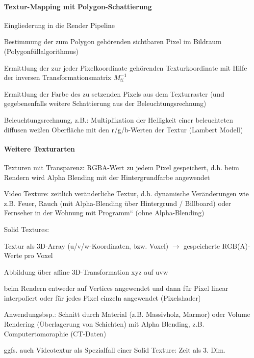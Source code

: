 \documentclass[landscape]{article}
\begin{document}
\begin{multicols}{3}
  \paragraph{Textur-Mapping mit Polygon-Schattierung}
  Eingliederung in die Render Pipeline
  \begin{itemize*}
    \item Bestimmung der zum Polygon gehörenden sichtbaren Pixel im Bildraum (Polygonfüllalgorithmus)
    \item Ermittlung der zur jeder Pixelkoordinate gehörenden Texturkoordinate mit Hilfe der inversen Transformationsmatrix $M_{ti}^{-1}$
    \item Ermittlung der Farbe des zu setzenden Pixels aus dem Texturraster (und gegebenenfalls weitere Schattierung aus der Beleuchtungsrechnung)
    \item Beleuchtungsrechnung, z.B.: Multiplikation der Helligkeit einer beleuchteten diffusen weißen Oberfläche mit den r/g/b-Werten der Textur (Lambert Modell)
  \end{itemize*}
  
  \paragraph{Weitere Texturarten}
  \begin{itemize*}
    \item Texturen mit Transparenz: RGBA-Wert zu jedem Pixel gespeichert, d.h. beim Rendern wird Alpha Blending mit der Hintergrundfarbe angewendet
    \item Video Texture: zeitlich veränderliche Textur, d.h. dynamische Veränderungen wie z.B. Feuer, Rauch (mit Alpha-Blending über Hintergrund / Billboard) oder Fernseher in der Wohnung mit Programm“ (ohne Alpha-Blending)
    \item Solid Textures:
    \item Textur als 3D-Array (u/v/w-Koordinaten, bzw. Voxel) $\rightarrow$ gespeicherte RGB(A)-Werte pro Voxel
    \item Abbildung über affine 3D-Transformation xyz auf uvw
    \item beim Rendern entweder auf Vertices angewendet und dann für Pixel linear interpoliert oder für jedes Pixel einzeln angewendet (Pixelshader)
    \item Anwendungsbsp.: Schnitt durch Material (z.B. Massivholz, Marmor) oder Volume Rendering (Überlagerung von Schichten) mit Alpha Blending, z.B. Computertomoraphie (CT-Daten)
    \item ggfs. auch Videotextur als Spezialfall einer Solid Texture: Zeit als 3. Dim.
  \end{itemize*}
  

\end{multicols}
\end{document}
